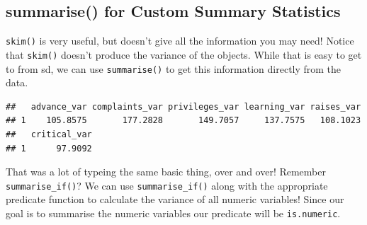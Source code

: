 \documentclass[]{book}
\newenvironment{Shaded}{\begin{snugshade}}{\end{snugshade}}
\newcommand{\DataTypeTok}[1]{\textcolor[rgb]{0.13,0.29,0.53}{#1}}
\newcommand{\KeywordTok}[1]{\textcolor[rgb]{0.13,0.29,0.53}{\textbf{#1}}}
\newcommand{\NormalTok}[1]{#1}
\newcommand{\OperatorTok}[1]{\textcolor[rgb]{0.81,0.36,0.00}{\textbf{#1}}}
\newcommand{\StringTok}[1]{\textcolor[rgb]{0.31,0.60,0.02}{#1}}
\theoremstyle{definition}
\theoremstyle{definition}
\theoremstyle{definition}
\theoremstyle{remark}
\begin{document}
\hypertarget{summarise-for-custom-summary-statistics}{%
\subsection{summarise() for Custom Summary Statistics}\label{summarise-for-custom-summary-statistics}}

\texttt{skim()} is very useful, but doesn't give all the information you may need! Notice that \texttt{skim()} doesn't produce the variance of the objects. While that is easy to get to from sd, we can use \texttt{summarise()} to get this information directly from the data.

\begin{Shaded}
\end{Shaded}

\begin{verbatim}
##   advance_var complaints_var privileges_var learning_var raises_var
## 1    105.8575       177.2828       149.7057     137.7575   108.1023
##   critical_var
## 1      97.9092
\end{verbatim}

That was a lot of typeing the same basic thing, over and over! Remember \texttt{summarise\_if()}? We can use \texttt{summarise\_if()} along with the appropriate predicate function to calculate the variance of all numeric variables! Since our goal is to summarise the numeric variables our predicate will be \texttt{is.numeric}.

\begin{Shaded}
\end{Shaded}
\end{document}
